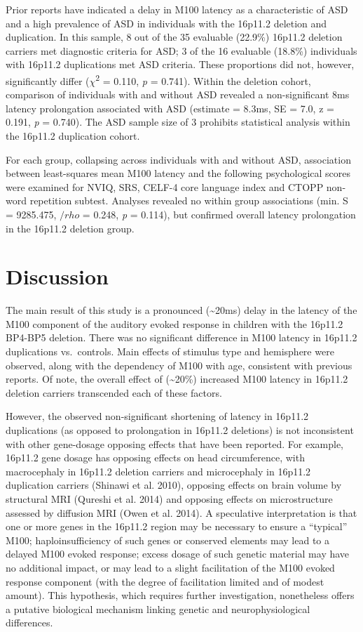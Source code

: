\documentclass[]{article}
\begin{document}
Prior reports have indicated a delay in M100 latency as a characteristic
of ASD and a high prevalence of ASD in individuals with the 16p11.2
deletion and duplication. In this sample, 8 out of the 35 evaluable
(22.9\%) 16p11.2 deletion carriers met diagnostic criteria for ASD; 3 of
the 16 evaluable (18.8\%) individuals with 16p11.2 duplications met ASD
criteria. These proportions did not, however, significantly differ
(\(\chi\)\textsuperscript{2} = 0.110, \emph{p} = 0.741). Within the
deletion cohort, comparison of individuals with and without ASD revealed
a non-significant 8ms latency prolongation associated with ASD (estimate
= 8.3ms, SE = 7.0, z = 0.191, \emph{p} = 0.740). The ASD sample size of
3 prohibits statistical analysis within the 16p11.2 duplication cohort.

For each group, collapsing across individuals with and without ASD,
association between least-squares mean M100 latency and the following
psychological scores were examined for NVIQ, SRS, CELF-4 core language
index and CTOPP non-word repetition subtest. Analyses revealed no within
group associations (min. S = 9285.475, \(/rho\) = 0.248, \emph{p} =
0.114), but confirmed overall latency prolongation in the 16p11.2
deletion group.

\section{Discussion}\label{discussion}

The main result of this study is a pronounced (\textasciitilde{}20ms)
delay in the latency of the M100 component of the auditory evoked
response in children with the 16p11.2 BP4-BP5 deletion. There was no
significant difference in M100 latency in 16p11.2 duplications
vs.~controls. Main effects of stimulus type and hemisphere were
observed, along with the dependency of M100 with age, consistent with
previous reports. Of note, the overall effect of (\textasciitilde{}20\%)
increased M100 latency in 16p11.2 deletion carriers transcended each of
these factors.

However, the observed non-significant shortening of latency in 16p11.2
duplications (as opposed to prolongation in 16p11.2 deletions) is not
inconsistent with other gene-dosage opposing effects that have been
reported. For example, 16p11.2 gene dosage has opposing effects on head
circumference, with macrocephaly in 16p11.2 deletion carriers and
microcephaly in 16p11.2 duplication carriers (Shinawi et al. 2010),
opposing effects on brain volume by structural MRI (Qureshi et al. 2014)
and opposing effects on microstructure assessed by diffusion MRI (Owen
et al. 2014). A speculative interpretation is that one or more genes in
the 16p11.2 region may be necessary to ensure a ``typical'' M100;
haploinsufficiency of such genes or conserved elements may lead to a
delayed M100 evoked response; excess dosage of such genetic material may
have no additional impact, or may lead to a slight facilitation of the
M100 evoked response component (with the degree of facilitation limited
and of modest amount). This hypothesis, which requires further
investigation, nonetheless offers a putative biological mechanism
linking genetic and neurophysiological differences.
\end{document}
